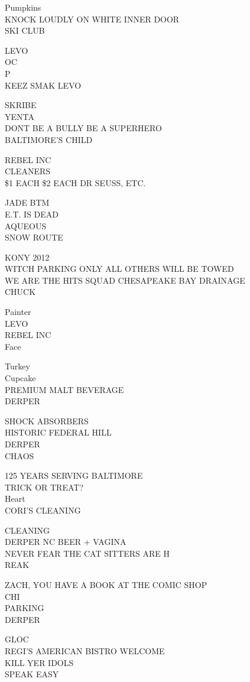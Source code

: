 \documentclass[10pt,letterpaper]{article}
\begin{document}
Pumpkins\\
KNOCK LOUDLY ON WHITE INNER DOOR\\
SKI CLUB

LEVO\\
OC\\
P\\
KEEZ SMAK LEVO

SKRIBE\\
YENTA\\
DONT BE A BULLY BE A SUPERHERO\\
BALTIMORE'S CHILD

REBEL INC\\
CLEANERS\\
\$1 EACH \$2 EACH DR SEUSS, ETC.

JADE BTM\\
E.T. IS DEAD\\
AQUEOUS\\
SNOW ROUTE

KONY 2012\\
WITCH PARKING ONLY ALL OTHERS WILL BE TOWED\\
WE ARE THE HITS SQUAD CHESAPEAKE BAY DRAINAGE\\
CHUCK

Painter\\
LEVO\\
REBEL INC\\
Face

Turkey\\
Cupcake\\
PREMIUM MALT BEVERAGE\\
DERPER

SHOCK ABSORBERS\\
HISTORIC FEDERAL HILL\\
DERPER\\
CHAOS

125 YEARS SERVING BALTIMORE\\
TRICK OR TREAT?\\
Heart\\
CORI'S CLEANING

CLEANING\\
DERPER NC BEER + VAGINA\\
NEVER FEAR THE CAT SITTERS ARE H\\
REAK

ZACH, YOU HAVE A BOOK AT THE COMIC SHOP\\
CHI\\
PARKING\\
DERPER

GLOC\\
REGI'S AMERICAN BISTRO WELCOME\\
KILL YER IDOLS\\
SPEAK EASY
\end{document}
